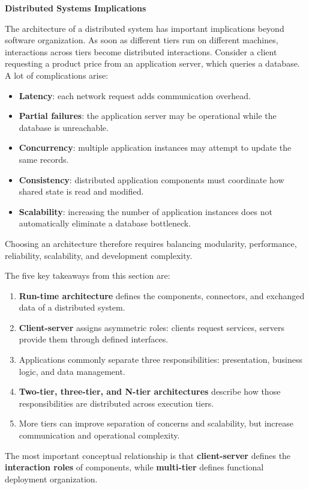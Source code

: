 \highspace
\begin{flushleft}
    \textcolor{Red2}{ \textbf{Distributed Systems Implications}}
\end{flushleft}
The architecture of a distributed system has important implications beyond software organization. As soon as different tiers run on different machines, interactions across tiers become distributed interactions. Consider a client requesting a product price from an application server, which queries a database. A lot of complications arise:
\begin{itemize}
    \item \textbf{Latency}: each network request adds communication overhead.
    \item \textbf{Partial failures}: the application server may be operational while the database is unreachable.
    \item \textbf{Concurrency}: multiple application instances may attempt to update the same records.
    \item \textbf{Consistency}: distributed application components must coordinate how shared state is read and modified.
    \item \textbf{Scalability}: increasing the number of application instances does not automatically eliminate a database bottleneck.
\end{itemize}
Choosing an architecture therefore requires balancing modularity, performance, reliability, scalability, and development complexity.

\highspace
\begin{takeawaysbox}
    The five key takeaways from this section are:
    \begin{enumerate}
        \item \textbf{Run-time architecture} defines the components, connectors, and exchanged data of a distributed system.
        \item \textbf{Client-server} assigns asymmetric roles: clients request services, servers provide them through defined interfaces.
        \item Applications commonly separate three responsibilities: presentation, business logic, and data management.
        \item \textbf{Two-tier, three-tier, and N-tier architectures} describe how those responsibilities are distributed across execution tiers.
        \item More tiers can improve separation of concerns and scalability, but increase communication and operational complexity.
    \end{enumerate}
    The most important conceptual relationship is that \textbf{client-server} defines the \textbf{interaction roles} of components, while \textbf{multi-tier} defines functional deployment organization.
\end{takeawaysbox}
